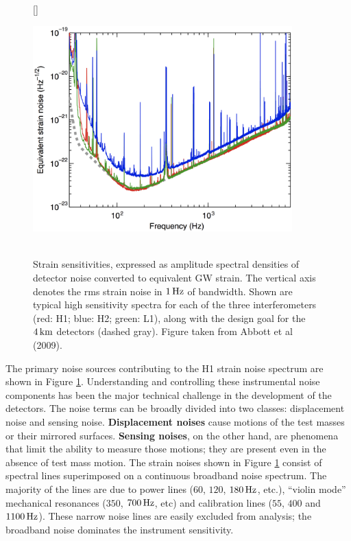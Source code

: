 \documentclass[a4paper,10pt]{article}
\begin{document}
\begin{figure}[h]
    [\FBwidth]
    {\caption{\footnotesize{\\Strain sensitivities, expressed as amplitude spectral densities of detector noise converted to equivalent GW strain. The vertical axis denotes the rms strain noise in $1\,{\rm Hz}$ of bandwidth. Shown are typical high sensitivity spectra for each of the three interferometers (red: H1; blue: H2; green: L1), along with the design goal for the $4\,{\rm km}$ detectors (dashed gray). Figure taken from Abbott et al (2009).}}
    \label{fig:strainnoise}}
    {\includegraphics[width=10cm]{figures/StrainNoise.png}}
\end{figure}

{\noindent}The primary noise sources contributing to the H1 strain noise spectrum are shown in Figure \ref{fig:strainnoise}. Understanding and controlling these instrumental noise components has been the major technical challenge in the development of the detectors. The noise terms can be broadly divided into two classes: displacement noise and sensing noise. \textbf{Displacement noises} cause motions of the test masses or their mirrored surfaces. \textbf{Sensing noises}, on the other hand, are phenomena that limit the ability to measure those motions; they are present even in the absence of test mass motion. The strain noises shown in Figure \ref{fig:strainnoise} consist of spectral lines superimposed on a continuous broadband noise spectrum. The majority of the lines are due to power lines ($60$, $120$, $180\,{\rm Hz}$, etc.), ``violin mode'' mechanical resonances ($350$, $700\,{\rm Hz}$, etc) and calibration lines ($55$, $400$ and $1100\,{\rm Hz}$). These narrow noise lines are easily excluded from analysis; the broadband noise dominates the instrument sensitivity.
\end{document}
